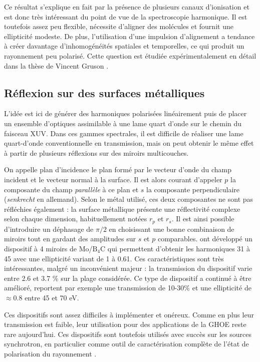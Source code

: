 Ce résultat s'explique en fait par la présence de plusieurs canaux d'ionisation et est donc très intéressant du point de vue de la spectroscopie harmonique. Il est toutefois assez peu flexible, nécessite d'aligner des molécules et fournit une ellipticité modeste. De plus, l'utilisation d'une impulsion d'alignement a tendance à créer davantage d'inhomogénéités spatiales et temporelles, ce qui produit un rayonnement peu polarisé. Cette question est étudiée expérimentalement en détail dans la thèse de Vincent Gruson .


\subsection{Réflexion sur des surfaces métalliques}
\label{sec:metalsurface}
L'idée est ici de générer des harmoniques polarisées linéairement puis de placer un ensemble d'optiques assimilable à une lame quart d'onde sur le chemin du faisceau XUV. Dans ces gammes spectrales, il est difficile de réaliser une lame quart-d'onde conventionnelle en transmission, mais on peut obtenir le même effet à partir de plusieurs réflexions sur des miroirs multicouches. \par
On appelle plan d'incidence le plan formé par le vecteur d'onde du champ incident et le vecteur normal à la surface. Il est alors courant d'appeler $p$ la composante du champ \textit{parallèle} à ce plan et $s$ la composante perpendiculaire (\textit{senkrecht} en allemand). Selon le métal utilisé, ces deux composantes ne sont pas réfléchies également : la surface métallique présente une réflectivité complexe selon chaque dimension, habituellement notées $r_p$ et $r_s$. Il est ainsi possible d'introduire un déphasage de $\pi/2$ en choisissant une bonne combinaison de miroirs tout en gardant des amplitudes sur $s$ et $p$ comparables.  ont développé un dispositif à 4 miroirs de Mo/$\text{B}_\text{4}$C qui permettent d'obtenir les harmoniques 31 à 45 avec une ellipticité variant de 1 à 0.61. Ces caractéristiques sont très intéressantes, malgré un inconvénient majeur : la transmission du dispositif varie entre 2.6 et 3.7 \% sur la plage considérée. Ce type de dispositif a continué à être amélioré,  reportent par exemple une transmission de 10-30\% et une ellipticité de $\approx 0.8$ entre 45 et 70 eV.\par

Ces dispositifs sont assez difficiles à implémenter et onéreux. Comme en plus leur transmission est faible, leur utilisation pour des applications de la GHOE reste rare aujourd'hui. Ces dispositifs sont toutefois utilisés avec succès sur les sources synchrotron, en particulier comme outil de caractérisation complète de l'état de polarisation du rayonnement . 


